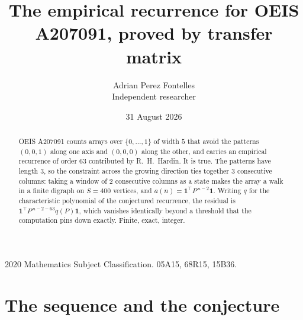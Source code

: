 \documentclass[11pt,a4paper]{article}
\title{The empirical recurrence for OEIS A207091, proved by transfer matrix}
\author{Adrian Perez Fontelles\\ \small Independent researcher}
\date{31 August 2026}
\theoremstyle{plain}
\theoremstyle{definition}
\begin{document}
\maketitle

\begin{abstract}
OEIS A207091 counts arrays over $\{0,\dots,1\}$ of width $5$ that avoid the patterns
$(0,0,1)$ along one axis and $(0,0,0)$ along the other, and carries an empirical recurrence of
order $63$ contributed by R.~H.~Hardin. It is true. The patterns have length $3$, so
the constraint across the growing direction ties together $3$ consecutive columns: taking a
window of $2$ consecutive columns as a state makes the array a walk in a finite digraph
on $S=400$ vertices, and $a(n)=\mathbf{1}^{\!\top}P^{\,n-2}\mathbf{1}$. Writing $q$
for the characteristic polynomial of the conjectured recurrence, the residual is
$\mathbf{1}^{\!\top}P^{\,n-2-63}q(P)\mathbf{1}$, which vanishes identically
beyond a threshold that the computation pins down exactly. Finite, exact, integer.
\end{abstract}

\noindent\small 2020 Mathematics Subject Classification. 05A15, 68R15, 15B36.\normalsize

\section{The sequence and the conjecture}
\end{document}
